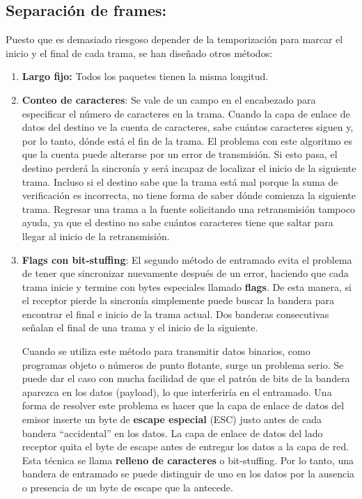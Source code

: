 \subsection{Separación de frames:}
Puesto que es demasiado riesgoso depender de la temporización para marcar el inicio y el final de cada trama, se han diseñado otros métodos:

\begin{enumerate}
  \item \textbf{Largo fijo:} Todos los paquetes tienen la misma longitud.
  \item \textbf{Conteo de caracteres}: Se vale de un campo en el encabezado para especificar el número de caracteres en la trama. Cuando la capa de enlace de datos del destino ve la cuenta de caracteres, sabe cuántos caracteres siguen y, por lo tanto, dónde está el fin de la trama. El problema con este algoritmo es que la cuenta puede alterarse por un error de transmisión. Si esto pasa, el destino perderá la sincronía y será incapaz de localizar el inicio de la siguiente trama. Incluso si el destino sabe que la trama está mal porque la suma de verificación es incorrecta, no tiene
  forma de saber dónde comienza la siguiente trama. Regresar una trama a la fuente solicitando una retransmisión tampoco ayuda, ya que el destino no sabe cuántos caracteres tiene que saltar para llegar al inicio de la retransmisión.
  \item \textbf{Flags con bit-stuffing}: El segundo método de entramado evita el problema de tener que sincronizar nuevamente después de un error, haciendo que cada trama inicie y termine con bytes especiales llamado \textbf{flags}. De esta manera, si el receptor pierde la sincronía simplemente puede buscar la bandera para encontrar el final e inicio de la trama actual. Dos banderas consecutivas señalan el final de una trama y el inicio de la siguiente. 
  
  Cuando se utiliza este método para transmitir datos binarios, como programas objeto o números de punto flotante, surge un problema serio. Se puede dar el caso con mucha facilidad de que el patrón de bits de la bandera aparezca en los datos (payload), lo que interferiría en el entramado. Una forma de resolver este problema es hacer que la capa de enlace de datos del emisor inserte un byte de \textbf{escape especial} (ESC) justo antes de cada bandera “accidental” en los datos. La capa de enlace de datos del lado receptor quita el byte de escape antes de entregar los datos a la capa de red. Esta técnica se llama \textbf{relleno de caracteres} o bit-stuffing. Por lo tanto, una bandera de entramado se puede distinguir de uno en los datos por la ausencia o presencia de un byte de escape que la antecede.
\end{enumerate}

